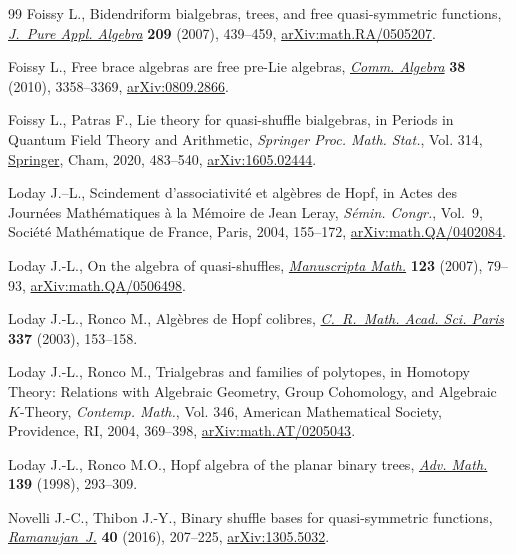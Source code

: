 \documentclass[pdftex]{sigma}
\numberwithin{equation}{section}
\theoremstyle{definition}
\theoremstyle{plain}
\begin{document}
\begin{thebibliography}{99}
Foissy L., Bidendriform bialgebras, trees, and free quasi-symmetric functions,
 \href{https://doi.org/10.1016/j.jpaa.2006.06.005}{\textit{J.~Pure Appl. Algebra}} \textbf{209} (2007), 439--459,
 \href{https://arxiv.org/abs/math.RA/0505207}{arXiv:math.RA/0505207}.

Foissy L., Free brace algebras are free pre-{L}ie algebras, \href{https://doi.org/10.1080/00927870903115000}{\textit{Comm.
 Algebra}} \textbf{38} (2010), 3358--3369, \href{https://arxiv.org/abs/0809.2866}{arXiv:0809.2866}.

Foissy L., Patras F., Lie theory for quasi-shuffle bialgebras, in Periods in
 {Q}uantum {F}ield {T}heory and {A}rithmetic, \textit{Springer Proc. Math.
 Stat.}, Vol. 314, \href{https://doi.org/10.1007/978-3-030-37031-2_19}{Springer}, Cham, 2020, 483--540, \href{https://arxiv.org/abs/1605.02444}{arXiv:1605.02444}.

Loday J.--L., Scindement d'associativit\'e et alg\`ebres de {H}opf, in Actes des
 {J}ourn\'ees {M}ath\'ematiques \`a la {M}\'emoire de {J}ean {L}eray,
 \textit{S\'emin. Congr.}, Vol.~9, Soci\'et\'e Math\'ematique de France,
 Paris, 2004, 155--172, \href{https://arxiv.org/abs/math.QA/0402084}{arXiv:math.QA/0402084}.

Loday J.-L., On the algebra of quasi-shuffles, \href{https://doi.org/10.1007/s00229-007-0086-2}{\textit{Manuscripta Math.}}
 \textbf{123} (2007), 79--93, \href{https://arxiv.org/abs/math.QA/0506498}{arXiv:math.QA/0506498}.

Loday J.-L., Ronco M., Alg\`ebres de {H}opf colibres, \href{https://doi.org/10.1016/S1631-073X(03)00288-7}{\textit{C.~R.~Math. Acad.
 Sci. Paris}} \textbf{337} (2003), 153--158.

Loday J.-L., Ronco M., Trialgebras and families of polytopes, in Homotopy
 {T}heory: {R}elations with {A}lgebraic {G}eometry, {G}roup {C}ohomology, and
 {A}lgebraic {$K$}-{T}heory, \textit{Contemp. Math.}, Vol. 346, American
 Mathematical Society, Providence, RI, 2004, 369--398,
 \href{https://arxiv.org/abs/math.AT/0205043}{arXiv:math.AT/0205043}.

Loday J.-L., Ronco M.O., Hopf algebra of the planar binary trees, \href{https://doi.org/10.1006/aima.1998.1759}{\textit{Adv.
 Math.}} \textbf{139} (1998), 293--309.

Novelli J.-C., Thibon J.-Y., Binary shuffle bases for quasi-symmetric functions,
 \href{https://doi.org/10.1007/s11139-016-9777-1}{\textit{Ramanujan~J.}} \textbf{40} (2016), 207--225, \href{https://arxiv.org/abs/1305.5032}{arXiv:1305.5032}.


\end{thebibliography}
\end{document}
